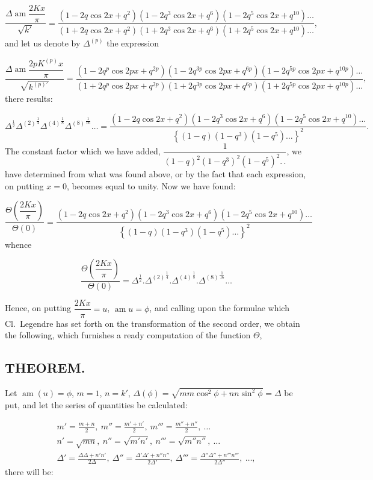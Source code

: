 \documentclass{article}
\begin{document}
\[
\frac{\Delta\operatorname{am}\dfrac{2Kx}{\pi}}{\sqrt{k'}}=\frac{(1-2q\cos2x+q^{2})(1-2q^{3}\cos2x+q^{6})(1-2q^{5}\cos2x+q^{10})\ldots}{(1+2q\cos2x+q^{2})(1+2q^{3}\cos2x+q^{6})(1+2q^{5}\cos2x+q^{10})\ldots},
\]
and let us denote by $\Delta^{(p)}$ the expression

\[
\frac{\Delta\operatorname{am}\dfrac{2pK^{(p)}x}{\pi}}{\sqrt{k^{(p)\prime}}}=\frac{(1-2q^{p}\cos2px+q^{2p})(1-2q^{3p}\cos2px+q^{6p})(1-2q^{5p}\cos2px+q^{10p})\ldots}{(1+2q^{p}\cos2px+q^{2p})(1+2q^{3p}\cos2px+q^{6p})(1+2q^{5p}\cos2px+q^{10p})\ldots},
\]
there results:

\[
\Delta^{\frac{1}{2}}{\Delta^{(2)}}^{\frac{1}{4}}{\Delta^{(4)}}^{\frac{1}{8}}{\Delta^{(8)}}^{\frac{1}{16}}\ldots=\frac{(1-2q\cos2x+q^{2})(1-2q^{3}\cos2x+q^{6})(1-2q^{5}\cos2x+q^{10})\ldots}{\left\{(1-q)(1-q^{3})(1-q^{5})\ldots\right\}^{2}}.
\]
The constant factor which we have added, $\dfrac{1}{(1-q)^{2}(1-q^{3})^{2}(1-q^{5})^{2}.\,.}$, we have determined from what was found above, or by the fact that each expression, on putting $x=0$, becomes equal to unity. Now we have found:

\[
\frac{\Theta\left(\dfrac{2Kx}{\pi}\right)}{\Theta(0)}=\frac{(1-2q\cos2x+q^{2})(1-2q^{3}\cos2x+q^{6})(1-2q^{5}\cos2x+q^{10})\ldots}{\left\{(1-q)(1-q^{3})(1-q^{5})\ldots\right\}^{2}}
\]
whence

\[
\frac{\Theta\left(\dfrac{2Kx}{\pi}\right)}{\Theta(0)}=\Delta^{\frac{1}{2}}.{\Delta^{(2)}}^{\frac{1}{4}}.{\Delta^{(4)}}^{\frac{1}{8}}.{\Delta^{(8)}}^{\frac{1}{16}}\ldots
\]

Hence, on putting $\dfrac{2Kx}{\pi}=u$, $\operatorname{am}u=\phi$, and calling upon the formulae which Cl.\ Legendre has set forth on the transformation of the second order, we obtain the following, which furnishes a ready computation of the function $\Theta$,

\subsection*{THEOREM.}

Let $\operatorname{am}(u)=\phi$, $m=1$, $n=k'$, $\Delta(\phi)=\sqrt{mm\cos^{2}\phi+nn\sin^{2}\phi}=\Delta$ be put, and let the series of quantities be calculated:

\[
\begin{gathered}
m'=\frac{m+n}{2},\ m''=\frac{m'+n'}{2},\ m'''=\frac{m''+n''}{2},\ \ldots\\[1.5ex]
n'=\sqrt{mn},\ n''=\sqrt{m'n'},\ n'''=\sqrt{m''n''},\ \ldots\\[1.5ex]
\Delta'=\frac{\Delta\Delta+n'n'}{2\Delta},\ \Delta''=\frac{\Delta'\Delta'+n''n''}{2\Delta'},\ \Delta'''=\frac{\Delta''\Delta''+n'''n'''}{2\Delta''},\ \ldots,
\end{gathered}
\]
there will be:
\end{document}
